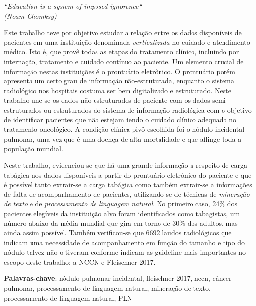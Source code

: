 \documentclass[
	12pt,				%
	openany,			%
  oneside,      %
	a4paper,			%
	brazil,			%
	french,			%
	spanish,			%
	english       %
	]{abntex2}
\begin{document}
\begin{epigrafe}
    \vspace*{\fill}
	\begin{flushright}
		\textit{``Education is a system of imposed ignorance``\\
    (Noam Chomksy)}
	\end{flushright}
\end{epigrafe}


\setlength{\absparsep}{18pt} %
\begin{resumo}[Resumo]
  Este trabalho teve por objetivo estudar a relação entre os dados disponíveis de pacientes em uma instituição denominada \emph{verticalizada} no cuidado e atendimento médico. Isto é, que provê todas as etapas do tratamento clínico, incluindo por internação, tratamento e cuidado contínuo ao paciente. Um elemento crucial de informação nestas instituições é o prontuário eletrônico. O prontuário porém apresenta um certo grau de informação não-estruturada, enquanto o sistema radiológico nos hospitais costuma ser bem digitalizado e estruturado. Neste trabalho une-se os dados não-estruturados de paciente com os dados semi-estruturados ou estruturados do sistema de informação radiológica com o objetivo de identificar pacientes que não estejam tendo o cuidado clínico adequado no tratamento oncológico. A condição clínica pivô escolhida foi o nódulo incidental pulmonar, uma vez que é uma doença de alta mortalidade e que aflinge toda a população mundial. 

  Neste trabalho, evidenciou-se que há uma grande informação a respeito de carga tabágica nos dados disponíveis a partir do prontuário eletrônico do paciente e que é possível tanto extrair-se a carga tabágica como também extrair-se a informações de falta de acompanhamento de pacientes, utilizando-se de técnicas de \emph{mineração de texto} e de \emph{processamento de linguagem natural}. No primeiro caso, 24\% dos pacientes elegíveis da instituição alvo foram identificados como tabagistas, um número abaixo da média mundial que gira em torno de 30\% dos adultos, mas ainda assim possível. Também verificou-se que 6692 laudos radiológicos que indicam uma necessidade de acompanhamento em função do tamanho e tipo do nódulo talvez não o tiveram conforme indicam as guideline mais importantes no escopo deste trabalho: a NCCN e Fleischner 2017.

 \textbf{Palavras-chave}: nódulo pulmonar incidental, fleischner 2017, nccn, câncer pulmonar, processamento de linguagem natural, mineração de texto, processamento de linguagem natural, PLN
\end{resumo}
\end{document}
